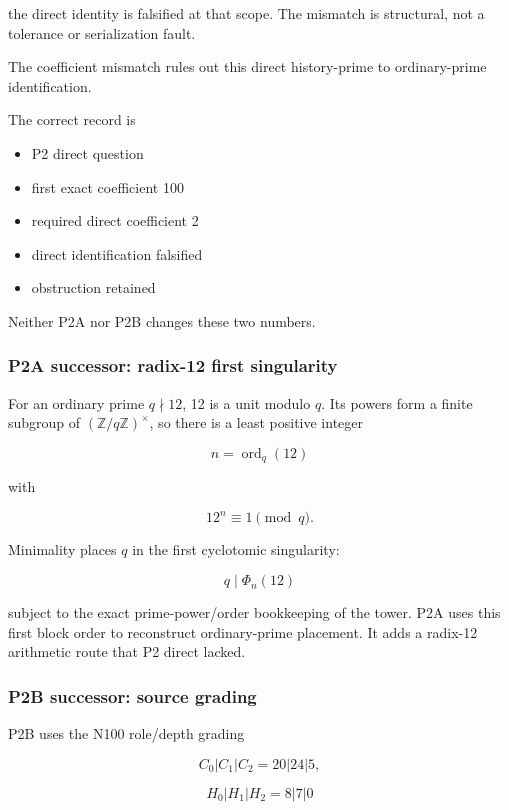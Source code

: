 the direct identity is falsified at that scope. The mismatch is
structural, not a tolerance or serialization fault.

The coefficient mismatch rules out this direct history-prime to ordinary-prime identification.

The correct record is

\begin{itemize}
\tightlist
\item
  P2 direct question
\item
  first exact coefficient 100
\item
  required direct coefficient 2
\item
  direct identification falsified
\item
  obstruction retained
\end{itemize}

Neither P2A nor P2B changes these two numbers.

\subsubsection{P2A successor: radix-12 first
singularity}\label{viii-ch09-p2a-successor-radix-12-first-singularity}

For an ordinary prime \(q\nmid12\), 12 is a unit modulo \(q\). Its
powers form a finite subgroup of \((\mathbb Z/q\mathbb Z)^\times\), so
there is a least positive integer

\[
n=\operatorname{ord}_q(12)
\]

with

\[
12^n\equiv1\pmod q.
\]

Minimality places \(q\) in the first cyclotomic singularity:

\[
q\mid\Phi_n(12)
\]

subject to the exact prime-power/order bookkeeping of the tower. P2A
uses this first block order to reconstruct ordinary-prime placement. It
adds a radix-12 arithmetic route that P2 direct lacked.

\subsubsection{P2B successor: source
grading}\label{viii-ch09-p2b-successor-source-grading}

P2B uses the N100 role/depth grading

\[
C_0|C_1|C_2=20|24|5,
\]

\[
H_0|H_1|H_2=8|7|0
\]

